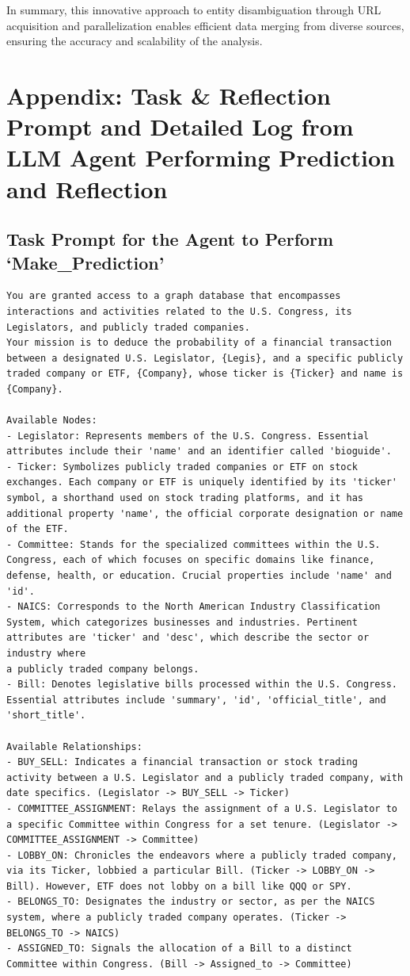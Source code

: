 \documentclass[15pt,letterpaper]{article}
\begin{document}
In summary, this innovative approach to entity disambiguation through URL acquisition and parallelization enables efficient data merging from diverse sources, ensuring the accuracy and scalability of the analysis.

\section{Appendix: Task \& Reflection Prompt and Detailed Log from LLM Agent Performing Prediction and Reflection} \label{app:log}

\subsection*{Task Prompt for the Agent to Perform `Make\_Prediction'}\label{app:log:task_prompt}
\begin{Verbatim}[breaklines=true, frame=single]
You are granted access to a graph database that encompasses interactions and activities related to the U.S. Congress, its Legislators, and publicly traded companies. 
Your mission is to deduce the probability of a financial transaction between a designated U.S. Legislator, {Legis}, and a specific publicly traded company or ETF, {Company}, whose ticker is {Ticker} and name is {Company}.

Available Nodes:
- Legislator: Represents members of the U.S. Congress. Essential attributes include their 'name' and an identifier called 'bioguide'.
- Ticker: Symbolizes publicly traded companies or ETF on stock exchanges. Each company or ETF is uniquely identified by its 'ticker' symbol, a shorthand used on stock trading platforms, and it has additional property 'name', the official corporate designation or name of the ETF.
- Committee: Stands for the specialized committees within the U.S. Congress, each of which focuses on specific domains like finance, defense, health, or education. Crucial properties include 'name' and 'id'.
- NAICS: Corresponds to the North American Industry Classification System, which categorizes businesses and industries. Pertinent attributes are 'ticker' and 'desc', which describe the sector or industry where 
a publicly traded company belongs.
- Bill: Denotes legislative bills processed within the U.S. Congress. Essential attributes include 'summary', 'id', 'official_title', and 'short_title'.

Available Relationships:
- BUY_SELL: Indicates a financial transaction or stock trading activity between a U.S. Legislator and a publicly traded company, with date specifics. (Legislator -> BUY_SELL -> Ticker)
- COMMITTEE_ASSIGNMENT: Relays the assignment of a U.S. Legislator to a specific Committee within Congress for a set tenure. (Legislator -> COMMITTEE_ASSIGNMENT -> Committee)
- LOBBY_ON: Chronicles the endeavors where a publicly traded company, via its Ticker, lobbied a particular Bill. (Ticker -> LOBBY_ON -> Bill). However, ETF does not lobby on a bill like QQQ or SPY.
- BELONGS_TO: Designates the industry or sector, as per the NAICS system, where a publicly traded company operates. (Ticker -> BELONGS_TO -> NAICS)
- ASSIGNED_TO: Signals the allocation of a Bill to a distinct Committee within Congress. (Bill -> Assigned_to -> Committee)


\end{Verbatim}
\end{document}
